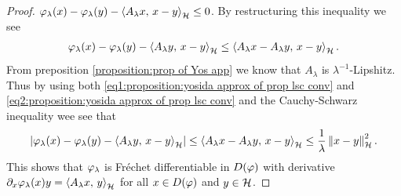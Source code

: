 \begin{proof}
	$\varphi_\lambda(x)-\varphi_\lambda(y)-\left\langle A_\lambda x,\,x-y\right\rangle_{\mathcal{H}}\leq 0 $.
	By restructuring this inequality we see
	\begin{align}\label{eq2:proposition:yosida approx of prop lsc conv}
		\varphi_\lambda(x)-\varphi_\lambda(y)-\left\langle A_\lambda y,\,x-y\right\rangle_{\mathcal{H}}
		\leq \left\langle A_\lambda x-A_\lambda y,\,x-y\right\rangle_{\mathcal{H}}.
	\end{align}
	From preposition \ref{proposition:prop of Yos app} we know that
	$ A_\lambda $ is $ \lambda^{-1} $-Lipshitz. Thus
	by using both \eqref{eq1:proposition:yosida approx of prop lsc conv}
	and \eqref{eq2:proposition:yosida approx of prop lsc conv}
	and  the Cauchy-Schwarz inequality wee see that
	\begin{align*}
		\left\vert \varphi_\lambda(x)-\varphi_\lambda(y)-\left\langle A_\lambda y,\,x-y\right\rangle_{\mathcal{H}}\right\vert
		\leq \left\langle A_\lambda x-A_\lambda y,\,x-y\right\rangle_{\mathcal{H}}
		\leq \frac{1}{\lambda}\left\Vert x-y\right\Vert_{\mathcal{H}}^2.
	\end{align*}
	This shows that $ \varphi_\lambda $ is Fréchet differentiable in $ D(\varphi) $ with
	derivative $ \partial_x\varphi_\lambda(x)y= \left\langle A_\lambda x,\,y\right\rangle_{\mathcal{H}} $
	for all $ x\in D(\varphi) $ and $ y\in\mathcal{H} $.\smallskip
	

\end{proof}
